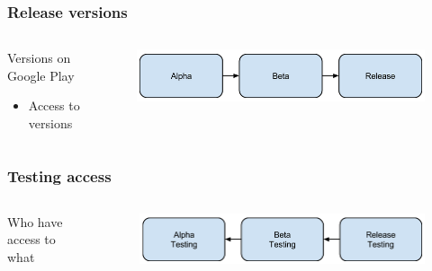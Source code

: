 \begin{frame}
	\begin{center}
		\frametitle{Release versions}
		\begin{columns} %
			\begin{column}{.3\textwidth}
				Versions on Google Play
				\begin{itemize}
					\item Access to versions
				\end{itemize}
			\end{column}%
			\begin{column}{.80\textwidth}
				\begin{figure}[H]
					\centering
					\includegraphics[width= 0.8 \textwidth]{pictures/Versions.png}
				\end{figure}
			\end{column}%
		\end{columns}
	\end{center}
\end{frame}

\begin{frame}
	\begin{center}
		\frametitle{Testing access}
		\begin{columns} %
			\begin{column}{.3\textwidth}
				Who have access to what
			\end{column}%
			\begin{column}{.80\textwidth}
				\begin{figure}[H]
					\centering
					\includegraphics[width= 0.8 \textwidth]{pictures/Access.png}
				\end{figure}
			\end{column}%
		\end{columns}
	\end{center}
\end{frame}

